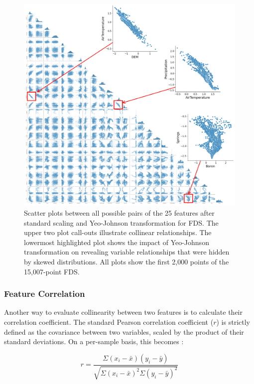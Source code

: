 \begin{figure}[!htp]
\centering
\includegraphics[width=\textwidth]{templates/images/Figure-Scatterplot_Scaled_Features.png}
\caption[Scaled FDS scatter plots]{Scatter plots between all possible pairs of the 25 features after standard scaling and Yeo-Johnson transformation for FDS. The upper two plot call-outs illustrate collinear relationships. The lowermost highlighted plot shows the impact of Yeo-Johnson transformation on revealing variable relationships that were hidden by skewed distributions. All plots show the first 2,000 points of the 15,007-point FDS.}
\label{fig:scaled_scatter}
\end{figure}

\subsubsection{Feature Correlation}\label{ch3:feat_corr}
Another way to evaluate collinearity between two features is to calculate their correlation coefficient. The standard Pearson correlation coefficient ($r$) is strictly defined as the covariance between two variables, scaled by the product of their standard deviations. On a per-sample basis, this becomes \citep[p.\ 70]{james_introduction_2013}:

\begin{equation}
    r = \frac{\Sigma(x_i-\bar{x})(y_i-\bar{y})}{\sqrt{\Sigma{(x_i-\bar{x})^2} \Sigma{(y_i-\bar{y})^2}}}
\end{equation}

